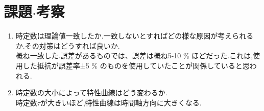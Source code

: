 \documentclass[uplatex]{jsarticle}
\begin{document}
	\section{課題$\cdot$考察}
		\begin{enumerate}
			\item{時定数は理論値一致したか.一致しないとすればどの様な原因が考えられるか.その対策はどうすれば良いか.} \\
				概ね一致した.誤差があるものでは、誤差は概ね5-10 \% ほどだった.これは,使用した抵抗が誤差率±5 \% のものを使用していたことが関係していると思われる.
			\item{時定数の大小によって特性曲線はどう変わるか.} \\
				時定数$\tau$が大きいほど,特性曲線は時間軸方向に大きくなる.
		\end{enumerate}
\end{document}
